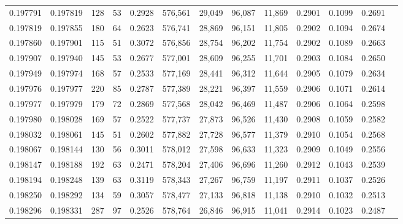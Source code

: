 \begin{tabular}{rrrrrrrrrrrrr}
0.197791 & 0.197819 &   128 &  53 &                                     0.2928 & 576,561 &  29,049 &  96,087 &  11,869 & 0.2901 & 0.1099 & 0.2691 \\
0.197819 & 0.197855 &   180 &  64 &                                     0.2623 & 576,741 &  28,869 &  96,151 &  11,805 & 0.2902 & 0.1094 & 0.2674 \\
0.197860 & 0.197901 &   115 &  51 &                                     0.3072 & 576,856 &  28,754 &  96,202 &  11,754 & 0.2902 & 0.1089 & 0.2663 \\
0.197907 & 0.197940 &   145 &  53 &                                     0.2677 & 577,001 &  28,609 &  96,255 &  11,701 & 0.2903 & 0.1084 & 0.2650 \\
0.197949 & 0.197974 &   168 &  57 &                                     0.2533 & 577,169 &  28,441 &  96,312 &  11,644 & 0.2905 & 0.1079 & 0.2634 \\
0.197976 & 0.197977 &   220 &  85 &                                     0.2787 & 577,389 &  28,221 &  96,397 &  11,559 & 0.2906 & 0.1071 & 0.2614 \\
0.197977 & 0.197979 &   179 &  72 &                                     0.2869 & 577,568 &  28,042 &  96,469 &  11,487 & 0.2906 & 0.1064 & 0.2598 \\
0.197980 & 0.198028 &   169 &  57 &                                     0.2522 & 577,737 &  27,873 &  96,526 &  11,430 & 0.2908 & 0.1059 & 0.2582 \\
0.198032 & 0.198061 &   145 &  51 &                                     0.2602 & 577,882 &  27,728 &  96,577 &  11,379 & 0.2910 & 0.1054 & 0.2568 \\
0.198067 & 0.198144 &   130 &  56 &                                     0.3011 & 578,012 &  27,598 &  96,633 &  11,323 & 0.2909 & 0.1049 & 0.2556 \\
0.198147 & 0.198188 &   192 &  63 &                                     0.2471 & 578,204 &  27,406 &  96,696 &  11,260 & 0.2912 & 0.1043 & 0.2539 \\
0.198194 & 0.198248 &   139 &  63 &                                     0.3119 & 578,343 &  27,267 &  96,759 &  11,197 & 0.2911 & 0.1037 & 0.2526 \\
0.198250 & 0.198292 &   134 &  59 &                                     0.3057 & 578,477 &  27,133 &  96,818 &  11,138 & 0.2910 & 0.1032 & 0.2513 \\
0.198296 & 0.198331 &   287 &  97 &                                     0.2526 & 578,764 &  26,846 &  96,915 &  11,041 & 0.2914 & 0.1023 & 0.2487 \\

\end{tabular}
